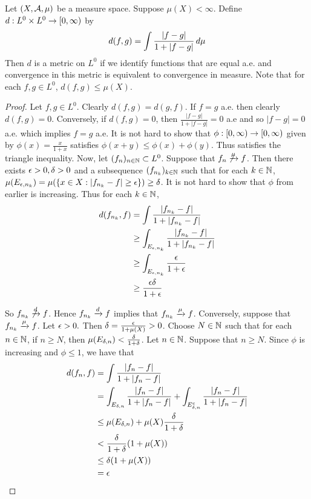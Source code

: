 \documentclass{book}
\begin{document}
	\begin{ex}  
		Let $(X, \mathcal{A}, \mu)$ be a measure space. Suppose $\mu(X) < \infty$. Define $d:L^0 \times L^0 \rightarrow [0,\infty)$ by $$d(f,g) = \int \frac{|f-g|}{1+|f-g|} \, d \mu $$
		Then $d$ is a metric on $L^0$ if we identify functions that are equal a.e. and convergence in this metric is equivalent to convergence in measure. Note that for each $f,g \in L^0$, $d(f,g) \leq \mu(X)$.
	\end{ex} 
	
	\begin{proof}
		Let $f,g \in L^0$. Clearly $d(f,g) = d(g,f)$. If $f = g$ a.e. then clearly $d(f,g) = 0$. Conversely, if $d(f,g) = 0$, then $\frac{|f-g|}{1 + |f-g|} = 0$ a.e and so $|f-g| = 0$ a.e. which implies $f =g$ a.e. It is not hard to show that $\phi: [0,\infty) \rightarrow [0,\infty)$ given by $\phi(x) = \frac{x}{1+x}$ satisfies $\phi(x+y) \leq \phi(x)+\phi(y)$. Thus satisfies the triangle inequality. Now, let $(f_n)_{n \in \mathbb{N}} \subset L^0$. Suppose that $f_n \not \xrightarrow{\mu} f$. Then there exists $\epsilon>0, \delta>0$ and a subsequence $(f_{n_k})_{k \in \mathbb{N}}$ such that for each $k \in \mathbb{N}$, $\mu(E_{\epsilon,n_k}) = \mu(\{x \in X: |f_{n_k} - f| \geq \epsilon\}) \geq \delta $. It is not hard to show that $\phi$ from earlier is increasing. Thus for each $k \in \mathbb{N}$, 
		\begin{align*}
			d(f_{n_k},f)
			&= \int \frac{|f_{n_k} -f|}{1+|f_{n_k} -f|}\\
			& \geq \int_{E_{\epsilon,n_k}} \frac{|f_{n_k} -f|}{1+|f_{n_k} -f|}\\
			& \geq \int_{E_{\epsilon, n_k}} \frac{\epsilon}{1+\epsilon}\\
			& \geq \frac{\epsilon\delta}{1+\epsilon}
		\end{align*}
		
		So $f_{n_k} \not \xrightarrow{d} f$. Hence $f_{n_k} \xrightarrow{d} f$ implies that $f_{n_k} \xrightarrow{\mu} f$. Conversely, suppose that $f_{n_k} \xrightarrow{\mu} f$. Let $\epsilon >0.$ Then $\delta = \frac{\epsilon}{1+\mu(X)} > 0$. Choose $N \in \mathbb{N}$ such that for each $n \in \mathbb{N}$, if $n \geq N$, then $\mu(E_{\delta, n}) < \frac{\delta}{1+\delta}$. Let $n \in \mathbb{N}$. Suppose that $n \geq N$. Since $\phi$ is increasing and $\phi \leq 1$, we have that 
		\begin{align*}
			d(f_n,f)
			&= \int \frac{|f_n -f|}{1+|f_n -f|}\\
			&= \int_{E_{\delta,n}} \frac{|f_n -f|}{1+|f_n -f|} + \int_{E_{\delta,n}^c} \frac{|f_n -f|}{1+|f_n -f|}\\
			&\leq \mu(E_{\delta,n}) + \mu(X)\frac{\delta}{1+\delta}\\
			& < \frac{\delta}{1+\delta}(1+\mu(X))\\
			& \leq \delta(1+\mu(X))\\
			& = \epsilon
		\end{align*}
	\end{proof}
	
\end{document}

